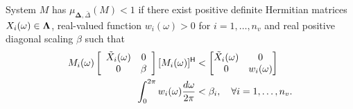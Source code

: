 \begin{thm}\label{thm:RMSSsuff}
System $M$ has $\mu_{\bm{\Delta},\bar{\Delta}}(M)<1$ if there exist 
positive definite Hermitian matrices $X_i(\omega)\in {\bf{\Lambda}}$, real-valued function $w_i(\omega)>0$ for $i=1,\hdots,n_v$ and real positive diagonal scaling $\beta$  such that 
\begin{subequations}
\begin{align}
M_i(\omega)
\left[
\begin{array}{cc}
    \tilde{X}_i(\omega) & 0 \\
    0 &\beta
\end{array}\right]
[M_i(\omega)]^{\mathsf{H}} & <
\begin{bmatrix}
    \tilde{X}_i(\omega) & 0 \\
    0 & w_i(\omega)
\end{bmatrix}\label{eqn:mu_freq_lmi1} \\
\int_0^{2\pi}w_i(\omega)\frac{d\omega}{2\pi} & < \beta_i,\quad \forall i=1,\hdots, n_v.
\end{align}
\end{subequations}
\end{thm}
% 



